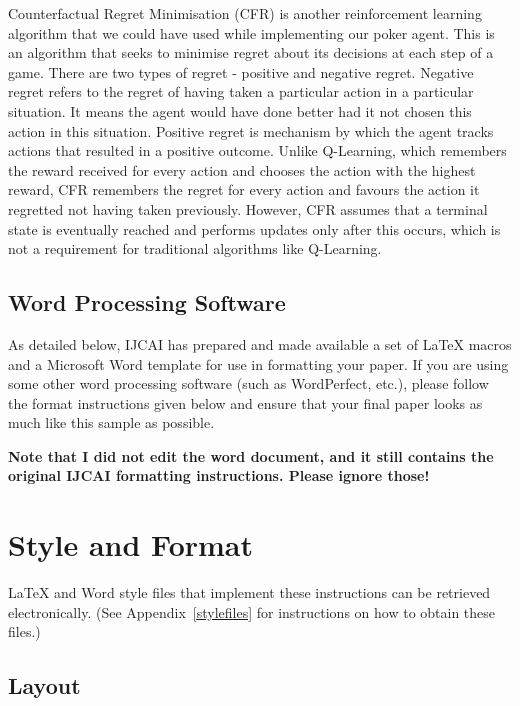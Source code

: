 \documentclass{article}
\begin{document}
Counterfactual Regret Minimisation (CFR) is another reinforcement learning algorithm that we could have used while implementing our poker agent. This is an algorithm that seeks to minimise regret about its decisions at each step of a game. There are two types of regret - positive and negative regret. Negative regret refers to the regret of having taken a particular action in a particular situation. It means the agent would have done better had it not chosen this action in this situation. Positive regret is mechanism by which the agent tracks actions that resulted in a positive outcome. Unlike Q-Learning, which remembers the reward received for every action and chooses the action with the highest reward, CFR remembers the regret for every action and favours the action it regretted not having taken previously. However, CFR assumes that a terminal state is eventually reached and performs updates only after this occurs, which is not a requirement for traditional algorithms like Q-Learning.

\subsection{Word Processing Software}

As detailed below, IJCAI has prepared and made available a set of
\LaTeX{} macros and a Microsoft Word template for use in formatting
your paper. If you are using some other word processing software (such
as WordPerfect, etc.), please follow the format instructions given
below and ensure that your final paper looks as much like this sample
as possible.

{\bf Note that I did not edit the word document, and it still contains the original IJCAI formatting instructions. Please ignore those!}

\section{Style and Format}

\LaTeX{} and Word style files that implement these instructions
can be retrieved electronically. (See Appendix~\ref{stylefiles} for
instructions on how to obtain these files.)

\subsection{Layout}
\end{document}
